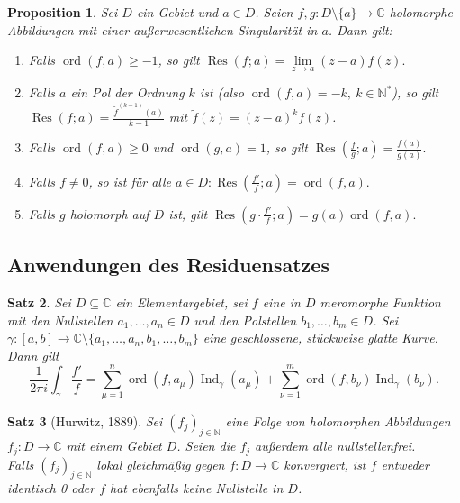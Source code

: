 \documentclass[a4paper,12pt]{article}
\theoremstyle{newthm}
\newtheorem{thm}{Satz}[subsection]
\newtheorem{prop}[thm]{Proposition}
\theoremstyle{newdef}
\theoremstyle{newrem}
\newcommand{\N}{\mathbb{N}}
\newcommand{\C}{\mathbb{C}}
\newcommand{\ord}[2]{\operatorname{ord} \left( #1,#2 \right)}
\newcommand{\Ind}[1]{\operatorname{Ind}_{#1}}
\newcommand{\Res}[2]{\operatorname{Res} \left( #1;#2 \right) }
\begin{document}
		\begin{prop}
			Sei $D$ ein Gebiet und $a \in D$. Seien $ f,g: D\setminus\{a\} \to \C $ holomorphe Abbildungen mit einer außerwesentlichen Singularität in $a$. Dann gilt:
			\begin{enumerate}[label={\alph*})]
				\item Falls $ \ord{f}{a} \geq -1 $, so gilt $ \Res{f}{a} = \lim\limits_{z \to a} (z-a)f(z). $
				\item Falls $a$ ein Pol der Ordnung $k$ ist (also $\ord{f}{a} = -k,\ k \in \N^*$), so gilt $ \Res{f}{a} = \frac{\tilde{f}^{(k-1)}(a)}{k-1} $ mit $\tilde{f}(z) = (z-a)^kf(z)$.
				\item Falls $\ord{f}{a} \geq 0$ und $\ord{g}{a} = 1$, so gilt $ \Res{\frac{f}{g}}{a} = \frac{f(a)}{g(a)}. $
				\item Falls $f \neq 0$, so ist für alle $a \in D: \Res{\frac{f'}{f}}{a} = \ord{f}{a}. $
				\item Falls $g$ holomorph auf $D$ ist, gilt $ \Res{g \cdot \frac{f'}{f}}{a} = g(a)\ord{f}{a}. $
			\end{enumerate}
		\end{prop}
	
	
	\subsection{Anwendungen des Residuensatzes}
		
		\begin{thm}\label{3.5.1}
			Sei $D \subseteq \C$ ein Elementargebiet, sei $f$ eine in $D$ meromorphe Funktion mit den Nullstellen $ a_1,\dotsc,a_n \in D $ und den Polstellen $ b_1,\dotsc,b_m \in D $. Sei $ \gamma:[a,b] \to \C\setminus\{a_1,\dotsc,a_n,b_1,\dotsc,b_m\} $ eine geschlossene, stückweise glatte Kurve. Dann gilt 
			\[ \frac{1}{2\pi i} \int_\gamma \frac{f'}{f} = \sum_{\mu=1}^n \ord{f}{a_\mu} \Ind{\gamma}(a_\mu) + \sum_{\nu=1}^m \ord{f}{b_\nu} \Ind{\gamma}(b_\nu). \]
		\end{thm}
		
		\begin{thm}[Hurwitz, 1889]
			Sei $ (f_j)_{j \in \N} $ eine Folge von holomorphen Abbildungen $ f_j : D \to \C $ mit einem Gebiet $D$. Seien die $f_j$ außerdem alle nullstellenfrei.\\
			Falls $(f_j)_{j \in \N}$ lokal gleichmäßig gegen $f: D \to \C$ konvergiert, ist $f$ entweder identisch 0 oder $f$ hat ebenfalls keine Nullstelle in $D$.
		\end{thm}
		
\end{document}
